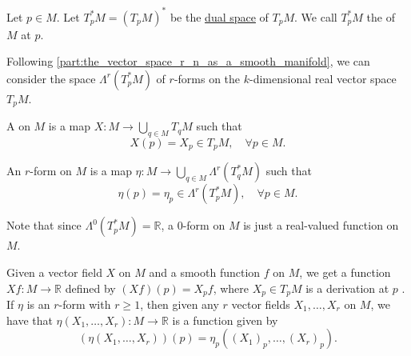 \documentclass[notoc,notitlepage]{tufte-book}
\begin{document}

\begin{defn}\label{defn:cotangent_space_on_a_submanifold}
  Let $p \in M$. Let $T^*_p M = (T_p M)^*$ be the
  \hyperref[defn:dual_space]{dual space} of $T_p M$. We call $T^*_p M$ the
   of $M$ at $p$.
\end{defn}

Following \cref{part:the_vector_space_r_n_as_a_smooth_manifold}, we can consider
the space $\Lambda^r(T^*_p M)$ of $r$-forms on the $k$-dimensional real vector
space $T_p M$.

\begin{defn}\label{defn:vector_fields_on_submanifold}
  A  on $M$ is a map $X : M \to \bigcup_{q \in M} T_q M$ 
  such that
  \begin{equation*}
    X(p) = X_p \in T_p M, \quad \forall p \in M.
  \end{equation*}
\end{defn}

\begin{defn}\label{defn:forms_on_submanifolds}
  An $r$-form on $M$ is a map $\eta : M \to \bigcup_{q \in M} \Lambda^r(T_q^*
  M)$ such that
  \begin{equation*}
    \eta(p) = \eta_p \in \Lambda^r(T_p^* M), \quad \forall p \in M.
  \end{equation*}
\end{defn}

\begin{note}
  Note that since $\Lambda^0(T_p^* M) = \mathbb{R}$, a $0$-form on $M$ is just a
  real-valued function on $M$.
\end{note}

\begin{remark}
  Given a vector field $X$ on $M$ and a smooth function $f$ on $M$, we get a
  function $X f : M \to \mathbb{R}$ defined by $(Xf)(p) = X_p f$, where $X_p \in
  T_p M$ is a derivation at $p$ . If $\eta$
  is an $r$-form with $r \geq 1$, then given any $r$ vector fields $X_1, \ldots,
  X_r$ on $M$, we have that $\eta(X_1, \ldots, X_r) : M \to \mathbb{R}$ is a
  function given by
  \begin{equation*}
    (\eta(X_1, \ldots, X_r))(p) = \eta_p((X_1)_p, \ldots, (X_r)_p).
  \end{equation*}
\end{remark}
\end{document}
